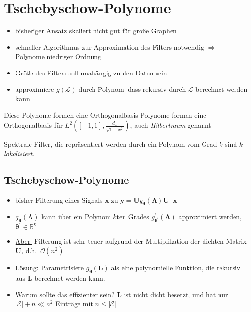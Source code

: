 \section{Tschebyschow-Polynome}

\begin{itemize}
  \item bisheriger Ansatz skaliert nicht gut für große Graphen
  \item schneller Algorithmus zur Approximation des Filters notwendig $\Rightarrow$ Polynome niedriger Ordnung
  \item Größe des Filters soll unahängig zu den Daten sein
  \item approximiere $g(\mathcal{L})$ durch Polynom, dass rekursiv durch $\mathcal{L}$ berechnet werden kann
\end{itemize}

Diese Polynome formen eine Orthogonalbasis
Polynome formen eine Orthogonalbasis für $L^2 \left([-1, 1], \frac{d_x}{\sqrt{1-x^2}}\right)$, auch \emph{Hilbertraum} genannt

Spektrale Filter, die repräsentiert werden durch ein Polynom vom Grad $k$ sind \emph{$k$-lokalisiert}.


\subsection{Tschebyschow-Polynome}

\begin{itemize}
  \item bisher Filterung eines Signals $\mathbf{x}$ zu $\mathbf{y} = \mathbf{U}g_{\mathbf{\theta}}\left(\mathbf{\Lambda}\right)\mathbf{U}^{\top}\mathbf{x}$
  \item $g_{\mathbf{\theta}}\left(\mathbf{\Lambda}\right)$ kann über ein Polynom $k$ten Grades $g^{\prime}_{\mathbf{\theta}^{\prime}}\left(\mathbf{\Lambda}\right)$ approximiert werden, $\mathbf{\theta}^{\prime} \in \mathbb{R}^k$
  \item \underline{Aber:} Filterung ist sehr teuer aufgrund der Multiplikation der dichten Matrix $\mathbf{U}$, d.h.\ $\mathcal{O}\left(n^2\right)$
  \item \underline{Lösung:} Parametrisiere $g_{\mathbf{\theta}}\left(\mathbf{L}\right)$ als eine polynomielle Funktion, die rekursiv aus $\mathbf{L}$ berechnet werden kann.
  \item Warum sollte das effizienter sein? $\mathbf{L}$ ist nicht dicht besetzt, und hat nur $\left|\mathcal{E}\right| + n \ll n^2$ Einträge mit $n \leq \left|\mathcal{E}\right|$
\end{itemize}

